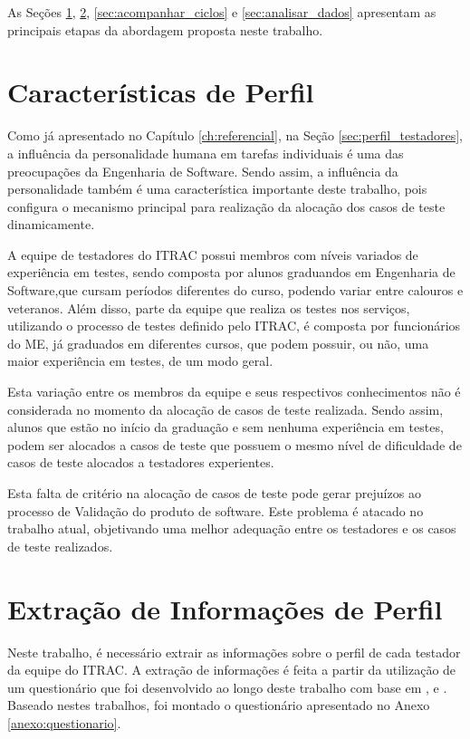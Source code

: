 As Seções \ref{sec:caracteristicas_importantes}, \ref{sec:extrair_caracteristicas}, \ref{sec:acompanhar_ciclos} e \ref{sec:analisar_dados} apresentam as principais etapas da abordagem proposta neste trabalho.

\section{Características de Perfil}
\label{sec:caracteristicas_importantes}

Como já apresentado no Capítulo \ref{ch:referencial}, na Seção \ref{sec:perfil_testadores}, a influência da personalidade humana em tarefas individuais é uma das preocupações da Engenharia de Software.  Sendo assim, a influência da personalidade também é uma característica importante deste trabalho, pois configura o mecanismo principal para realização da alocação dos casos de teste dinamicamente.  

A equipe de testadores do ITRAC possui membros com níveis variados de experiência em testes, sendo composta por alunos graduandos em Engenharia de Software,que cursam períodos diferentes do curso, podendo variar entre calouros e veteranos.  Além disso, parte da equipe que realiza os testes nos serviços, utilizando o processo de testes definido pelo ITRAC, é composta por funcionários do ME, já graduados em diferentes cursos, que podem possuir, ou não, uma maior experiência em testes, de um modo geral. 

Esta variação entre os membros da equipe e seus respectivos conhecimentos não é considerada no momento da alocação de casos de teste realizada.  Sendo assim, alunos que estão no início da graduação e sem nenhuma experiência em testes, podem ser alocados a casos de teste que possuem o mesmo nível de dificuldade de casos de teste alocados a testadores experientes. 

Esta falta de critério na alocação de casos de teste pode gerar prejuízos ao processo de Validação do produto de software. Este problema é atacado no trabalho atual, objetivando uma melhor adequação entre os testadores e os casos de teste realizados.

\section{Extração de Informações de Perfil}
\label{sec:extrair_caracteristicas}

Neste trabalho, é necessário extrair as informações sobre o perfil de cada testador da equipe do ITRAC. A extração de informações é feita a partir da utilização de um questionário que foi desenvolvido ao longo deste trabalho com base em \cite{Santos19SDPA}, \cite{geras2004survey} e \cite{groves2000survey}. Baseado nestes trabalhos, foi montado o questionário apresentado no Anexo \ref{anexo:questionario}. 

